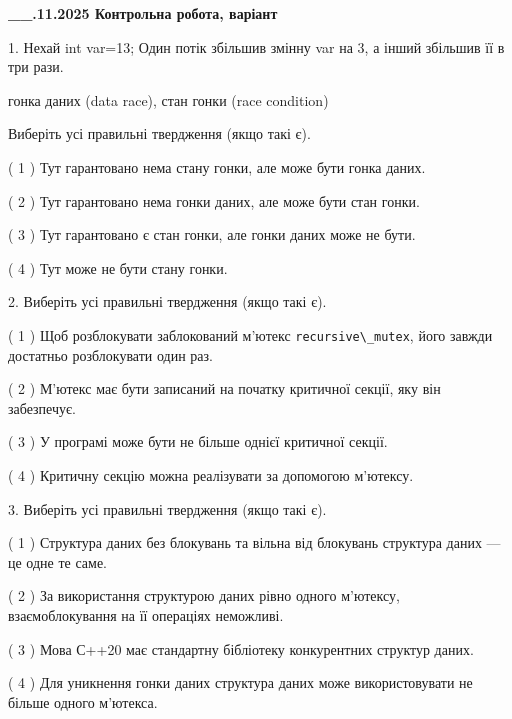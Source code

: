 \documentclass[12pt, ukrainian]{article}
\def\code#1{\Verb!#1!}
\begin{document}
\newpage
\begin {large}

\textbf{\_\_.11.2025 Контрольна робота, варіант  }\par


{
1. Нехай int var=13; Один потік збільшив змінну var на 3, а інший збільшив її в три рази.

гонка даних (data race), стан гонки (race condition)

Виберіть усі правильні твердження (якщо такі є).\par
\vspace{2mm}
( 1 ) Тут гарантовано нема стану гонки, але може бути гонка даних.%

( 2 ) Тут гарантовано нема гонки даних, але може бути стан гонки.%

( 3 ) Тут гарантовано є стан гонки, але гонки даних може не бути.%

( 4 ) Тут може не бути стану гонки.%


2. Виберіть усі правильні твердження (якщо такі є).\par
\vspace{2mm}

( 1 ) Щоб розблокувати заблокований м’ютекс \code{recursive\_mutex}, його завжди достатньо розблокувати один раз.%

( 2 ) М’ютекс має бути записаний на початку критичної секції, яку він забезпечує.%

( 3 ) У програмі може бути не більше однієї критичної секції.%

( 4 ) Критичну секцію можна реалізувати за допомогою м’ютексу.%


3. Виберіть усі правильні твердження (якщо такі є).\par
\vspace{2mm}

( 1 ) Структура даних без блокувань та вільна від блокувань структура даних --- це одне те саме.%

( 2 ) За використання структурою даних рівно одного м’ютексу, взаємоблокування на її операціях неможливі.%

( 3 ) Мова С++20 має стандартну бібліотеку конкурентних структур даних.%

( 4 ) Для уникнення гонки даних структура даних може використовувати не більше одного м’ютекса.%


}
\end{large}
\end{document}
